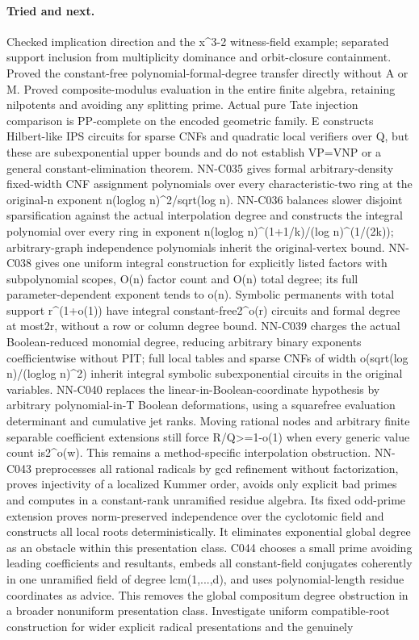 \paragraph{Tried and next.} Checked implication direction and the x\textasciicircum{}3-2 witness-field example; separated support inclusion from multiplicity dominance and orbit-closure containment. Proved the constant-free polynomial-formal-degree transfer directly without A or M. Proved composite-modulus evaluation in the entire finite algebra, retaining nilpotents and avoiding any splitting prime. Actual pure Tate injection comparison is PP-complete on the encoded geometric family. E constructs Hilbert-like IPS circuits for sparse CNFs and quadratic local verifiers over Q, but these are subexponential upper bounds and do not establish VP=VNP or a general constant-elimination theorem. NN-C035 gives formal arbitrary-density fixed-width CNF assignment polynomials over every characteristic-two ring at the original-n exponent n(loglog n)\textasciicircum{}2/sqrt(log n). NN-C036 balances slower disjoint sparsification against the actual interpolation degree and constructs the integral polynomial over every ring in exponent n(loglog n)\textasciicircum{}(1+1/k)/(log n)\textasciicircum{}(1/(2k)); arbitrary-graph independence polynomials inherit the original-vertex bound. NN-C038 gives one uniform integral construction for explicitly listed factors with subpolynomial scopes, O(n) factor count and O(n) total degree; its full parameter-dependent exponent tends to o(n). Symbolic permanents with total support r\textasciicircum{}(1+o(1)) have integral constant-free2\textasciicircum{}o(r) circuits and formal degree at most2r, without a row or column degree bound. NN-C039 charges the actual Boolean-reduced monomial degree, reducing arbitrary binary exponents coefficientwise without PIT; full local tables and sparse CNFs of width o(sqrt(log n)/(loglog n)\textasciicircum{}2) inherit integral symbolic subexponential circuits in the original variables. NN-C040 replaces the linear-in-Boolean-coordinate hypothesis by arbitrary polynomial-in-T Boolean deformations, using a squarefree evaluation determinant and cumulative jet ranks. Moving rational nodes and arbitrary finite separable coefficient extensions still force R/Q>=1-o(1) when every generic value count is2\textasciicircum{}o(w). This remains a method-specific interpolation obstruction. NN-C043 preprocesses all rational radicals by gcd refinement without factorization, proves injectivity of a localized Kummer order, avoids only explicit bad primes and computes in a constant-rank unramified residue algebra. Its fixed odd-prime extension proves norm-preserved independence over the cyclotomic field and constructs all local roots deterministically. It eliminates exponential global degree as an obstacle within this presentation class. C044 chooses a small prime avoiding leading coefficients and resultants, embeds all constant-field conjugates coherently in one unramified field of degree lcm(1,...,d), and uses polynomial-length residue coordinates as advice. This removes the global compositum degree obstruction in a broader nonuniform presentation class. Investigate uniform compatible-root construction for wider explicit radical presentations and the genuinely 